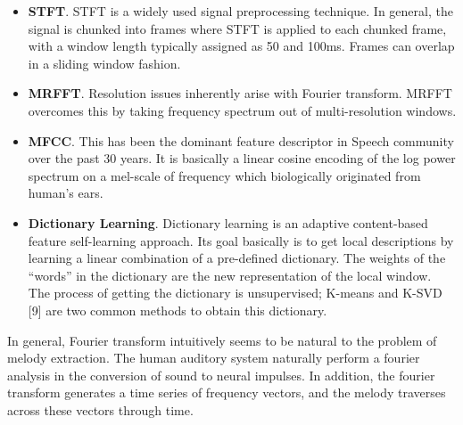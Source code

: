 \documentclass{article} %
\begin{document}
\begin{itemize}
\item \textbf{STFT}. STFT is a widely used signal preprocessing technique. In general, the signal is chunked into frames where STFT is applied to each chunked frame, with a window length typically assigned as 50 and 100ms. Frames can overlap in a sliding window fashion.

\item \textbf{MRFFT}. Resolution issues inherently arise with Fourier transform. MRFFT overcomes this by taking frequency spectrum out of multi-resolution windows.

\item \textbf{MFCC}. This has been the dominant feature descriptor in Speech community over the past 30 years. It is basically a linear cosine encoding of the log power spectrum on a mel-scale of frequency which biologically originated from human's ears. 

\item \textbf{Dictionary Learning}. Dictionary learning is an adaptive content-based feature self-learning approach. Its goal basically is to get local descriptions by learning a linear combination of a pre-defined dictionary. 
The weights of the “words” in the dictionary are the new representation of the local window. The process of getting the dictionary is unsupervised; K-means and K-SVD [9] are two common methods to obtain this dictionary.
\end{itemize}

In general, Fourier transform intuitively seems to be natural to the problem of melody extraction.  The human auditory system naturally perform a fourier analysis in the conversion of sound to neural impulses.  In addition, the fourier transform generates a time series of frequency vectors, and the melody traverses across these vectors through time.
\end{document}

